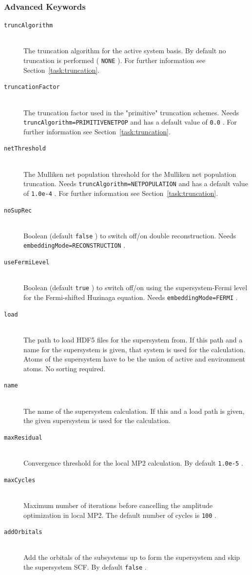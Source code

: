 \documentclass[bibliography=totocnumbered,a4paper,10pt,oneside]{scrbook}
\newcommand{\ttt}[1]{%
  \begingroup\setlength{\fboxsep}{1pt}%
  \colorbox{serenity-green!30}{\texttt{\hspace*{2pt}\vphantom{(g}#1\hspace*{2pt}}}%
  \endgroup
}
\begin{document}
\subsubsection{Advanced Keywords}
\begin{description}
	\item[\texttt{truncAlgorithm}]\hfill \\
	The truncation algorithm for the active system basis. By default no truncation is performed (\ttt{NONE}). For further information see Section~\ref{task:truncation}.
	\item[\texttt{truncationFactor}]\hfill \\
	The truncation factor used in the "primitive" truncation schemes. Needs \ttt{truncAlgorithm=PRIMITIVENETPOP} and has a default value of \ttt{0.0}. For further information see Section~\ref{task:truncation}.
	\item[\texttt{netThreshold}]\hfill \\
	The Mulliken net population threshold for the Mulliken net population truncation. Needs \ttt{truncAlgorithm=NETPOPULATION} and has a default value of \ttt{1.0e-4}.  For further information see Section~\ref{task:truncation}.
	\item[\texttt{noSupRec}]\hfill \\
	Boolean (default \ttt{false}) to switch off/on double reconstruction. Needs \ttt{embeddingMode=RECONSTRUCTION}.
	\item[\texttt{useFermiLevel}]\hfill \\
	Boolean (default \ttt{true}) to switch off/on using the supersystem-Fermi level for the Fermi-shifted Huzinaga equation. Needs \ttt{embeddingMode=FERMI}.	
  \item[\texttt{load}]\hfill \\
  The path to load HDF5 files for the supersystem from. If this path and a name for the supersystem is given, that system is used for the calculation. Atoms of the supersystem have to be the union of active and environment atoms. No sorting required.  
  \item[\texttt{name}]\hfill \\
  The name of the supersystem calculation. If this and a load path is given, the given supersystem is used for the calculation.
  \item[\texttt{maxResidual}]\hfill \\
  Convergence threshold for the local MP2 calculation. By default \ttt{1.0e-5}.
  \item[\texttt{maxCycles}]\hfill \\
  Maximum number of iterations before cancelling the amplitude optimization in local MP2. The default number of cycles is \ttt{100}.   
  \item[\texttt{addOrbitals}]\hfill \\
  Add the orbitals of the subsystems up to form the supersystem and skip the supersystem SCF. By default \ttt{false}.
\end{description}
\end{document}
